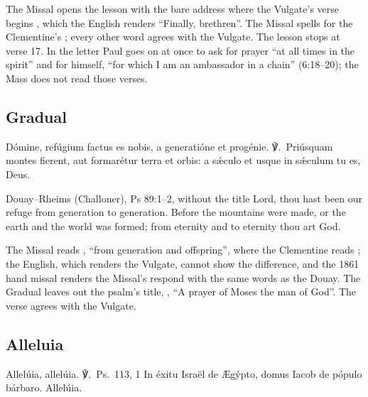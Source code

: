 \noindent The Missal opens the lesson with the bare address 
where the Vulgate's verse begins , which the English
renders ``Finally, brethren''. The Missal spells  for the Clementine's
; every other word agrees with the Vulgate. The lesson stops
at verse 17. In the letter Paul goes on at once to ask for prayer ``at all times
in the spirit'' and for himself, ``for which I am an ambassador in a chain''
(6:18--20); the Mass does not read those verses.

\subsection{Gradual}
\label{proper-gradual}


\begin{latinproper}
Dómine, refúgium factus es nobis, a generatióne et progénie. ℣.~Priúsquam
montes fierent, aut formarétur terra et orbis: a sǽculo et usque in sǽculum tu
es, Deus.
\end{latinproper}

\begin{englishwitness}{Douay--Rheims (Challoner), Ps 89:1--2, without the title}
Lord, thou hast been our refuge from generation to generation. Before the
mountains were made, or the earth and the world was formed; from eternity and to
eternity thou art God.
\end{englishwitness}

\noindent The Missal reads , ``from generation
and offspring'', where the Clementine reads ; the English, which renders the Vulgate, cannot show the
difference, and the 1861 hand missal renders the Missal's respond with the same
words as the Douay. The Gradual leaves out the psalm's title, , ``A prayer of Moses the man of God''. The verse agrees
with the Vulgate.

\subsection{Alleluia}
\label{proper-alleluia}


\begin{latinproper}
Allelúia, allelúia. ℣.~\textnormal{Ps.\ 113, 1} In éxitu Israël de Ægýpto,
domus Iacob de pópulo bárbaro. Allelúia.
\end{latinproper}

